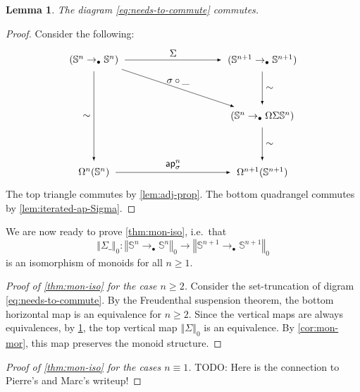 \documentclass[11pt,a4paper,oneside,reqno]{amsart}
\newtheorem{lemma}[theorem]{Lemma}
\theoremstyle{definition}
\theoremstyle{remark}
\newcommand{\sph}[1]{{\mathbb S}^{#1}}
\newcommand{\trunc}[2]{\mathopen{}\left\Vert #2\right\Vert_{#1}\mathclose{}}
\newcommand{\pointedm}{\rightarrow_\bullet}
\begin{document}
\begin{lemma} \label{lem:what-commutes-commutes}
 The diagram \eqref{eq:needs-to-commute} commutes.
\end{lemma}
\begin{proof}
 Consider the following:
\begin{equation}
\begin{tikzpicture}[x=6cm,y=-2cm,baseline=(current bounding box.center)]
 \tikzset{arrow/.style={shorten >=0.1cm,shorten <=.1cm,-latex}}
 \node (A) at (0,0) {$(\sph n \pointedm \sph n)$}; 
 \node (B) at (0,2) {$\Omega^n(\sph n)$}; 
 \node (C) at (1,2) {$\Omega^{n+1}(\sph {n+1})$}; 
 \node (D) at (1,0) {$(\sph {n+1} \pointedm \sph {n+1})$}; 
 \node (E) at (1,1) {$(\sph n \pointedm \Omega \Sigma \sph n)$};
 
 \draw[arrow] (A) to node [left] {$\sim$} (B);
 \draw[arrow] (B) to node [above] {$\mathsf{ap}^n_\sigma$} (C);
 \draw[arrow] (A) to node [above] {$\Sigma$} (D);
 \draw[arrow] (D) to node [right] {$\sim$} (E);
 \draw[arrow] (E) to node [right] {$\sim$} (C);
 \draw[arrow] (A) to node [above] {$\sigma \circ \_$} (E);
\end{tikzpicture}
\end{equation}
The top triangle commutes by \cref{lem:adj-prop}.
The bottom quadrangel commutes by \cref{lem:iterated-ap-Sigma}.
\end{proof}

We are now ready to prove
\cref{thm:mon-iso}, i.e.\ that 
\begin{equation}
 \trunc 0 {\Sigma \_} : \trunc 0 {\sph n \pointedm \sph n} \to \trunc 0 {\sph {n+1} \pointedm \sph {n+1}}
\end{equation}
is an isomorphism of monoids for all $n \geq 1$. 

\begin{proof}[Proof of \cref{thm:mon-iso} for the case $n \geq 2$]
 Consider the set-truncation of digram \eqref{eq:needs-to-commute}.
 By the Freudenthal suspension theorem, the bottom horizontal map is an equivalence for $n \geq 2$.
 Since the vertical maps are always equivalences, by \cref{lem:what-commutes-commutes}, the top vertical map $\trunc 0 \Sigma$ is an equivalence.
 By \cref{cor:mon-mor}, this map preserves the monoid structure.
\end{proof}

\begin{proof}[Proof of \cref{thm:mon-iso} for the cases $n \equiv 1$]
 TODO: Here is the connection to Pierre's and Marc's writeup!
\end{proof}
\end{document}
